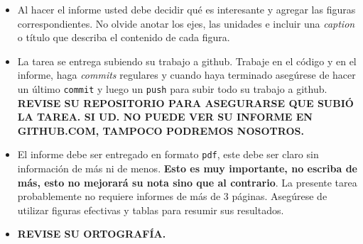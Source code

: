 \documentclass[letter, 11pt]{article}
\begin{document}
\begin{itemize}
\item Al hacer el informe usted debe decidir qué es interesante y agregar las
  figuras correspondientes. No olvide anotar los ejes, las unidades e incluir
  una \emph{caption} o título que describa el contenido de cada figura.

\item La tarea se entrega subiendo su trabajo a github. Trabaje en el código y
  en el informe, haga \textit{commits} regulares y cuando haya terminado
  asegúrese de hacer un último \texttt{commit} y luego un \texttt{push} para
  subir todo su trabajo a github. \textbf{REVISE SU REPOSITORIO PARA ASEGURARSE
  QUE SUBIÓ LA TAREA. SI UD. NO PUEDE VER SU INFORME EN GITHUB.COM, TAMPOCO
PODREMOS NOSOTROS.}

\item El informe debe ser entregado en formato \texttt{pdf}, este debe ser
  claro sin información de más ni de menos. \textbf{Esto es muy importante, no
  escriba de más, esto no mejorará su nota sino que al contrario}. La presente
  tarea probablemente no requiere informes de más de 3 páginas. Asegúrese de
  utilizar figuras efectivas y tablas para resumir sus resultados.

\item \textbf{REVISE SU ORTOGRAFÍA.}


\end{itemize}

\end{document}
